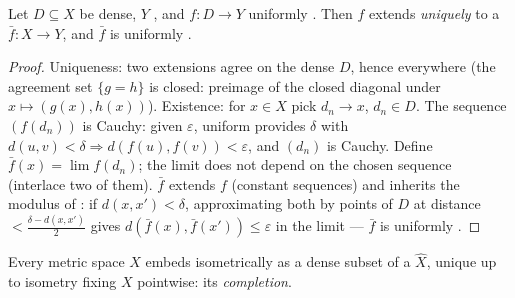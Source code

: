 \begin{theorem}
\label{thm:b3:complete:extension}
Let $D \subseteq X$ be dense, $Y$ , and $f \colon D \to
Y$ uniformly . Then $f$ extends \emph{uniquely} to a
 $\bar f \colon X \to Y$, and $\bar f$ is uniformly
.
\end{theorem}

\begin{proof}
Uniqueness: two  extensions agree on the dense $D$,
hence everywhere (the agreement set $\{g = h\}$ is closed:
preimage of the closed diagonal under $x\mapsto(g(x), h(x))$).
Existence: for $x \in X$ pick $d_n \to x$, $d_n \in D$. The
sequence $(f(d_n))$ is Cauchy: given $\varepsilon$, uniform
 provides $\delta$ with $d(u,v) < \delta \Rightarrow
d(f(u), f(v)) < \varepsilon$, and $(d_n)$ is Cauchy. Define
$\bar f(x) = \lim f(d_n)$; the limit does not depend on the
chosen sequence (interlace two of them). $\bar f$ extends $f$
(constant sequences) and inherits the modulus of : if
$d(x, x') < \delta$, approximating both by points of $D$ at
distance $< \frac{\delta - d(x,x')}2$ gives $d(\bar f(x), \bar
f(x')) \leq \varepsilon$ in the limit --- $\bar f$ is uniformly
.
\end{proof}

\begin{theorem}[Completion]\label{thm:b3:complete:completion}
Every metric space $X$ embeds isometrically as a dense subset of
a  $\hat X$, unique up to isometry fixing
$X$ pointwise: its \emph{completion}.
\end{theorem}

